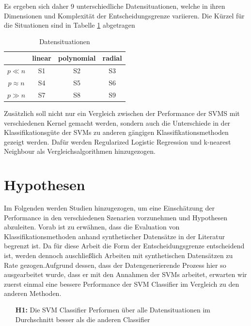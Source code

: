 \documentclass[
]{article}
\begin{document}
Es ergeben sich daher 9 unterschiedliche Datensituationen, welche in
ihren Dimensionen und Komplexität der Entscheidungsgrenze variieren. Die
Kürzel für die Situationen sind in Tabelle \ref{tab:datensituationen}
abgetragen

\begin{table}[H]
\begin{center}
\begin{tabular}{ |c|c|c|c| }
 \hline
  & linear & polynomial & radial \\
 \hline
 $p \ll n$ & S1 & S2 & S3 \\
 \hline
 $p \approx n$ & S4 & S5 & S6 \\
 \hline
 $p \gg n$ & S7 & S8 & S9 \\
 \hline
\end{tabular}
\end{center}
\caption{Datensituationen}
\label{tab:datensituationen}
\end{table}

Zusätzlich soll nicht nur ein Vergleich zwischen der Performance der
SVMS mit verschiedenen Kernel gemacht werden, sondern auch die
Unterschiede in der Klassifikationsgüte der SVMs zu anderen gängigen
Klassifikationsmethoden gezeigt werden. Dafür werden Regularized
Logistic Regression und k-nearest Neighbour als Vergleichsalgorithmen
hinzugezogen.

\section{Hypothesen}

Im Folgenden werden Studien hinzugezogen, um eine Einschätzung der
Performance in den verschiedenen Szenarien vorzunehmen und Hypothesen
abzuleiten. Vorab ist zu erwähnen, dass die Evaluation von
Klassifikationsmethoden anhand synthetischer Datensätze in der Literatur
begrenzt ist. Da für diese Arbeit die Form der Entscheidungsgrenze
entscheidend ist, werden dennoch auschließlich Arbeiten mit
synthetischen Datensätzen zu Rate gezogen.\newline Aufgrund dessen, dass
der Datengenerierende Prozess hier so ausgearbeitet wurde, dass er mit
den Annahmen der SVMs arbeitet, erwarten wir zuerst einmal eine bessere
Performance der SVM Classifier im Vergleich zu den anderen Methoden.

\begin{minipage}{0.9\linewidth}
\begin{itemize}[leftmargin=0.1\linewidth]
\item[\textbf{H1:}] Die SVM Classifier Performen über alle Datensituationen im Durchschnitt besser als die anderen Classifier
\end{itemize}
\end{minipage}
\end{document}
